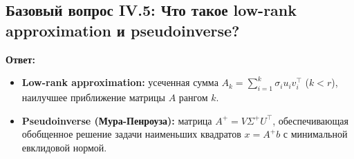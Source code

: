 \subsection{Базовый вопрос IV.5: Что такое low-rank approximation и pseudoinverse?}
\textbf{Ответ:}
\begin{itemize}
    \item \textbf{Low-rank approximation:} усеченная сумма $A_k = \sum_{i=1}^k \sigma_i u_i v_i^\top$ ($k < r$),
    наилучшее приближение матрицы $A$ рангом $k$.
    \item \textbf{Pseudoinverse (Мура-Пенроуза):} матрица $A^+ = V \Sigma^+ U^\top$, обеспечивающая обобщенное
    решение задачи наименьших квадратов $x = A^+ b$ с минимальной евклидовой нормой.
\end{itemize}